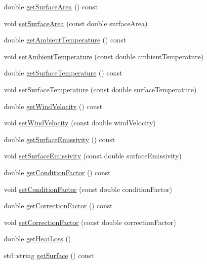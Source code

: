 \begin{DoxyCompactItemize}
\item 
double \hyperlink{class_wall_losses_ad4d3aa549cc7ab19e927823dbafed973}{get\+Surface\+Area} () const
\item 
void \hyperlink{class_wall_losses_acbbbe4b1ec44bb04e5e1db944017995c}{set\+Surface\+Area} (const double surface\+Area)
\item 
double \hyperlink{class_wall_losses_a806cb5860fe78d0379e3877f043655ad}{get\+Ambient\+Temperature} () const
\item 
void \hyperlink{class_wall_losses_a08a8f4c9add0ce78733be4558cc8410b}{set\+Ambient\+Temperature} (const double ambient\+Temperature)
\item 
double \hyperlink{class_wall_losses_ac2ce3cea6eef435a5fcf6a659b8e7d70}{get\+Surface\+Temperature} () const
\item 
void \hyperlink{class_wall_losses_a7aaa1bd0d7e0ec67db33668ccc6c48da}{set\+Surface\+Temperature} (const double surface\+Temperature)
\item 
double \hyperlink{class_wall_losses_ae68657cacdfbaf8cdc48324dd580cf3b}{get\+Wind\+Velocity} () const
\item 
void \hyperlink{class_wall_losses_ae376b7ce4e5b3c45a663395802c176a9}{set\+Wind\+Velocity} (const double wind\+Velocity)
\item 
double \hyperlink{class_wall_losses_ae1fce9523d14831ef6bc9b7823d5ea08}{get\+Surface\+Emissivity} () const
\item 
void \hyperlink{class_wall_losses_ad0ebd1a0a1b32a2358da15b6c8e63d3a}{set\+Surface\+Emissivity} (const double surface\+Emissivity)
\item 
double \hyperlink{class_wall_losses_a16ab4003a17f9e95f28b9390b92c2b27}{get\+Condition\+Factor} () const
\item 
void \hyperlink{class_wall_losses_a1533a7513460d22f433fb670700573a2}{set\+Condition\+Factor} (const double condition\+Factor)
\item 
double \hyperlink{class_wall_losses_a4ce6a0ec36cd868b14b041f18251cb6d}{get\+Correction\+Factor} () const
\item 
void \hyperlink{class_wall_losses_affdf3f6c3d54d73c7f91e1515fb12533}{set\+Correction\+Factor} (const double correction\+Factor)
\item 
double \hyperlink{class_wall_losses_a884da3507498878f619cbe5ba340c0ef}{get\+Heat\+Loss} ()
\item 
std\+::string \hyperlink{class_wall_losses_a10f5de20dc6fead726adbf62a9c49b09}{get\+Surface} () const
\item 

\end{DoxyCompactItemize}
